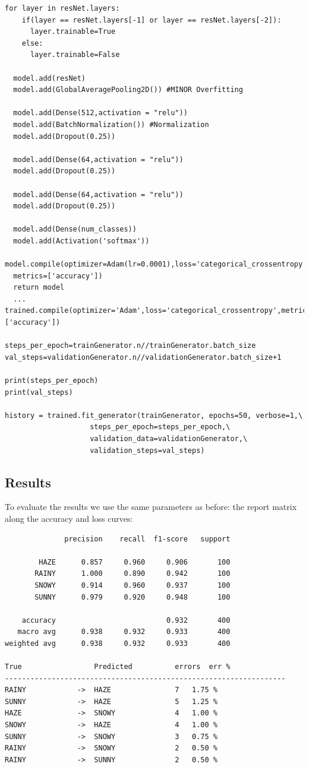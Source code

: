 \documentclass{article}
\begin{document}
\begin{verbatim}
for layer in resNet.layers:
    if(layer == resNet.layers[-1] or layer == resNet.layers[-2]):
      layer.trainable=True
    else:
      layer.trainable=False
  
  model.add(resNet)
  model.add(GlobalAveragePooling2D()) #MINOR Overfitting

  model.add(Dense(512,activation = "relu"))
  model.add(BatchNormalization()) #Normalization
  model.add(Dropout(0.25))

  model.add(Dense(64,activation = "relu"))
  model.add(Dropout(0.25))

  model.add(Dense(64,activation = "relu"))
  model.add(Dropout(0.25))

  model.add(Dense(num_classes))
  model.add(Activation('softmax'))
  model.compile(optimizer=Adam(lr=0.0001),loss='categorical_crossentropy',
  metrics=['accuracy'])
  return model
  ...
trained.compile(optimizer='Adam',loss='categorical_crossentropy',metrics=['accuracy'])

steps_per_epoch=trainGenerator.n//trainGenerator.batch_size
val_steps=validationGenerator.n//validationGenerator.batch_size+1

print(steps_per_epoch)
print(val_steps)

history = trained.fit_generator(trainGenerator, epochs=50, verbose=1,\
                    steps_per_epoch=steps_per_epoch,\
                    validation_data=validationGenerator,\
                    validation_steps=val_steps)

\end{verbatim}

\subsection{Results}
To evaluate the results we use the same parameters as before: the report matrix along the accuracy and loss curves:

\begin{verbatim}
              precision    recall  f1-score   support

        HAZE      0.857     0.960     0.906       100
       RAINY      1.000     0.890     0.942       100
       SNOWY      0.914     0.960     0.937       100
       SUNNY      0.979     0.920     0.948       100

    accuracy                          0.932       400
   macro avg      0.938     0.932     0.933       400
weighted avg      0.938     0.932     0.933       400

True                 Predicted         	errors 	err % 
------------------------------------------------------------------
RAINY            ->  HAZE              	7 	1.75 % 
SUNNY            ->  HAZE              	5 	1.25 % 
HAZE             ->  SNOWY             	4 	1.00 % 
SNOWY            ->  HAZE              	4 	1.00 % 
SUNNY            ->  SNOWY             	3 	0.75 % 
RAINY            ->  SNOWY             	2 	0.50 % 
RAINY            ->  SUNNY             	2 	0.50 % 
\end{verbatim}
\end{document}
